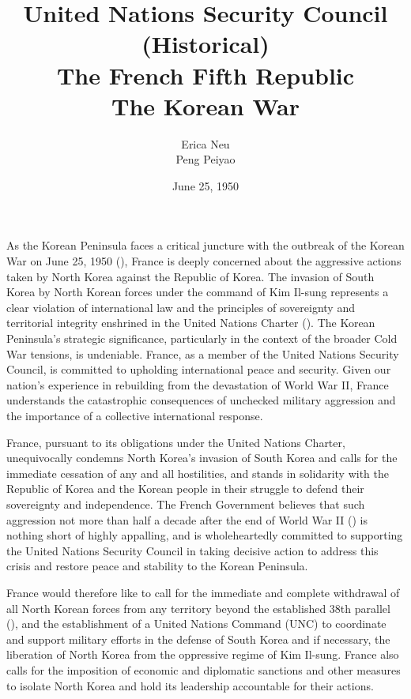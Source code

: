 \documentclass[a4paper,12pt]{article}
\title{
	\vspace{0.7in}
	United Nations Security Council (Historical)\\
	\vspace{1em}
	\textbf{The French Fifth Republic} \\
	\vspace{0.5em}
	\textbf{The Korean War}
	\vspace{4in}
}
\date{
	\vspace{0in}
	June 25, 1950
}
\author{
	Erica Neu\\ Peng Peiyao \\
}
\begin{document}
\maketitle

\clearpage


As the Korean Peninsula faces a critical juncture with the outbreak of the Korean War on June 25, 1950 (\cite{imperialwarmuseums_2024_a}), France is deeply concerned about the aggressive actions taken by North Korea against the Republic of Korea. The invasion of South Korea by North Korean forces under the command of Kim Il-sung represents a clear violation of international law and the principles of sovereignty and territorial integrity enshrined in the United Nations Charter (\cite{nations_2023_united}). The Korean Peninsula's strategic significance, particularly in the context of the broader Cold War tensions, is undeniable. France, as a member of the United Nations Security Council, is committed to upholding international peace and security. Given our nation's experience in rebuilding from the devastation of World War II, France understands the catastrophic consequences of unchecked military aggression and the importance of a collective international response.

France, pursuant to its obligations under the United Nations Charter, unequivocally condemns North Korea's invasion of South Korea and calls for the immediate cessation of any and all hostilities, and stands in solidarity with the Republic of Korea and the Korean people in their struggle to defend their sovereignty and independence. The French Government believes that such aggression not more than half a decade after the end of World War II (\cite{britannica_2024_world}) is nothing short of highly appalling, and is wholeheartedly committed to supporting the United Nations Security Council in taking decisive action to address this crisis and restore peace and stability to the Korean Peninsula.

France would therefore like to call for the immediate and complete withdrawal of all North Korean forces from any territory beyond the established 38th parallel (\cite{thenationalendowmentforthehumanities_2019_korea}), and the establishment of a United Nations Command (UNC) to coordinate and support military efforts in the defense of South Korea and if necessary, the liberation of North Korea from the oppressive regime of Kim Il-sung. France also calls for the imposition of economic and diplomatic sanctions and other measures to isolate North Korea and hold its leadership accountable for their actions.
\end{document}
